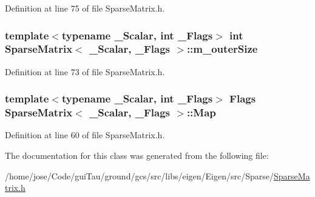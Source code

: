 Definition at line 75 of file Sparse\-Matrix.\-h.

\hypertarget{class_sparse_matrix_a99709cdbe631a5c07e4a302a6a136ddb}{
\subsubsection[{m\-\_\-outer\-Size}]{\setlength{\rightskip}{0pt plus 5cm}template$<$typename \-\_\-\-Scalar, int \-\_\-\-Flags$>$ {\bf int} {\bf Sparse\-Matrix}$<$ \-\_\-\-Scalar, \-\_\-\-Flags $>$\-::m\-\_\-outer\-Size\hspace{0.3cm}{\ttfamily [protected]}}}\label{class_sparse_matrix_a99709cdbe631a5c07e4a302a6a136ddb}


Definition at line 73 of file Sparse\-Matrix.\-h.

\hypertarget{class_sparse_matrix_a0362f04c2a71fde43bf7c690d05bb0ae}{
\subsubsection[{Map}]{\setlength{\rightskip}{0pt plus 5cm}template$<$typename \-\_\-\-Scalar, int \-\_\-\-Flags$>$ {\bf Flags} {\bf Sparse\-Matrix}$<$ \-\_\-\-Scalar, \-\_\-\-Flags $>$\-::{\bf Map}}}\label{class_sparse_matrix_a0362f04c2a71fde43bf7c690d05bb0ae}


Definition at line 60 of file Sparse\-Matrix.\-h.



The documentation for this class was generated from the following file\-:\begin{DoxyCompactItemize}
\item 
/home/jose/\-Code/gui\-Tau/ground/gcs/src/libs/eigen/\-Eigen/src/\-Sparse/\hyperlink{_sparse_matrix_8h}{Sparse\-Matrix.\-h}\end{DoxyCompactItemize}
